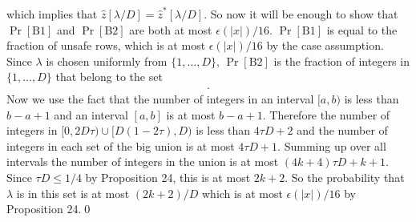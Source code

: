which implies that $\hat z[\lambda/D]=\hat z^*[\lambda/D]$. So now it will be enough to show that $\Pr[\mathrm{B1}]$ and $\Pr[\mathrm{B2}]$ are both at most $\epsilon(|x|)/16$. $\Pr[\mathrm{B1}]$ is equal to the fraction of unsafe rows, which is at most $\epsilon(|x|)/16$ by the case assumption.
Since $\lambda$ is chosen uniformly from $\{1,\ldots,D\}$, $\Pr[\mathrm{B2}]$ is the fraction of integers in $\{1,\ldots,D\}$ that belong to the set
\begin{multline*}[0,2D\tau)\cup[D(1-2\tau),D)\\\cup\bigcup_{j=1}^k[D(\mu(B^*_{\hat i,j})-2\tau),D(\mu(B^*_{\hat i,j})+2\tau)].\end{multline*}
Now we use the fact that the number of integers in an interval $[a,b)$ is less than $b-a+1$ and an interval $[a,b]$ is at most $b-a+1$. Therefore the number of integers in $[0,2D\tau)\cup[D(1-2\tau),D)$ is less than $4\tau D+2$ and the number of integers in each set of the big union is at most $4\tau D+1$. Summing up over all intervals the number of integers in the union is at most $(4k+4)\tau D+k+1$. Since $\tau D\le1/4$ by Proposition 24, this is at most $2k+2$. So the probability that $\lambda$ is in this set is at most $(2k+2)/D$ which is at most $\epsilon(|x|)/16$ by Proposition 24.\qed
